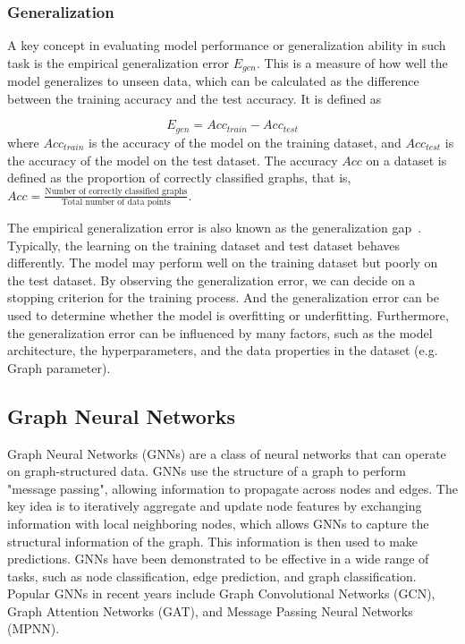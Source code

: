 \documentclass{article}
\begin{document}
\subsubsection{Generalization}
A key concept in evaluating model performance or generalization ability in such task is the empirical generalization error $E_{gen}$. This is a measure of how well the model generalizes to unseen data, which can be calculated as the difference between the training accuracy and the test accuracy. It is defined as

$$
    E_{gen} = {Acc_{train}} - {Acc_{test}}
$$
where $Acc_{train}$ is the accuracy of the model on the training dataset, and $Acc_{test}$ is the accuracy of the model on the test dataset. The accuracy $Acc$ on a dataset is defined as the proportion of correctly classified graphs, that is, $Acc = \frac{\text{Number of correctly classified graphs}}{\text{Total number of data points}}$.

The empirical generalization error is also known as the generalization gap~\cite{goodfellow2016deep}. Typically, the learning on the training dataset and test dataset behaves differently. The model may perform well on the training dataset but poorly on the test dataset. By observing the generalization error, we can decide on a stopping criterion for the training process. And the generalization error can be used to determine whether the model is overfitting or underfitting. Furthermore, the generalization error can be influenced by many factors, such as the model architecture, the hyperparameters, and the data properties in the dataset (e.g. Graph parameter). 

\subsection{Graph Neural Networks}
Graph Neural Networks (GNNs) are a class of neural networks that can operate on graph-structured data. GNNs use the structure of a graph to perform "message passing", allowing information to propagate across nodes and edges. The key idea is to iteratively aggregate and update node features by exchanging information with local neighboring nodes, which allows GNNs to capture the structural information of the graph. This information is then used to make predictions. GNNs have been demonstrated to be effective in a wide range of tasks, such as node classification, edge prediction, and graph classification. Popular GNNs in recent years include Graph Convolutional Networks (GCN), Graph Attention Networks (GAT), and Message Passing Neural Networks (MPNN).
\end{document}
